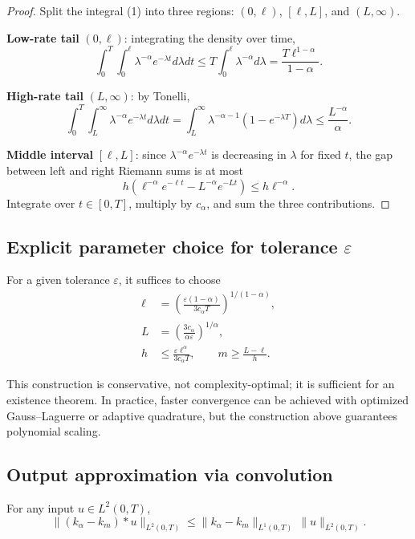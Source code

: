 \begin{proof}
Split the integral (1) into three regions: \((0, \ell)\), \([\ell, L]\), and \((L, \infty)\).

\textbf{Low-rate tail} \((0, \ell)\): integrating the density over time,
\[
\int_0^T \int_0^\ell \lambda^{-\alpha} e^{-\lambda t} d\lambda dt
\le T \int_0^\ell \lambda^{-\alpha} d\lambda
= \frac{T \ell^{1-\alpha}}{1-\alpha}.
\]

\textbf{High-rate tail} \((L, \infty)\): by Tonelli,
\[
\int_0^T \int_L^\infty \lambda^{-\alpha} e^{-\lambda t} d\lambda dt
= \int_L^\infty \lambda^{-\alpha-1}(1-e^{-\lambda T}) d\lambda
\le \frac{L^{-\alpha}}{\alpha}.
\]

\textbf{Middle interval} \([\ell, L]\): since \(\lambda^{-\alpha} e^{-\lambda t}\) is decreasing in \(\lambda\) for fixed \(t\), the gap between left and right Riemann sums is at most
\[
h \left( \ell^{-\alpha} e^{-\ell t} - L^{-\alpha} e^{-Lt} \right)
\le h \ell^{-\alpha}.
\]
Integrate over \(t \in [0,T]\), multiply by \(c_\alpha\), and sum the three contributions.
\end{proof}

\subsection{Explicit parameter choice for tolerance \(\varepsilon\)}

For a given tolerance \(\varepsilon\), it suffices to choose
\begin{align}
\ell &= \left( \frac{\varepsilon(1-\alpha)}{3 c_\alpha T} \right)^{1/(1-\alpha)}, \\
L &= \left( \frac{3 c_\alpha}{\alpha \varepsilon} \right)^{1/\alpha}, \\
h &\le \frac{\varepsilon \ell^\alpha}{3 c_\alpha T},
\qquad
m \ge \frac{L-\ell}{h}.
\end{align}

This construction is conservative, not complexity-optimal; it is sufficient for an existence theorem. In practice, faster convergence can be achieved with optimized Gauss--Laguerre or adaptive quadrature, but the construction above guarantees polynomial scaling.

\subsection{Output approximation via convolution}

\begin{theorem}
\label{thm:T9c}
For any input \(u \in L^2(0,T)\),
\[
\boxed{
\|(k_\alpha - k_m) * u\|_{L^2(0,T)}
\le \|k_\alpha - k_m\|_{L^1(0,T)} \, \|u\|_{L^2(0,T)}.
}
\tag{5}
\]
\end{theorem}

